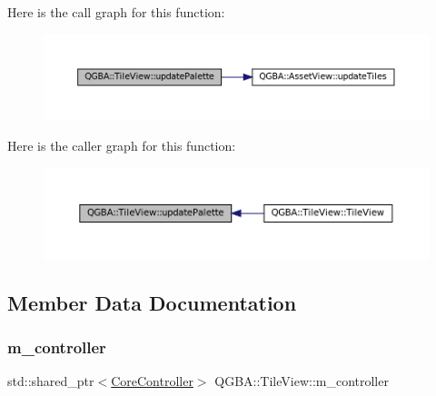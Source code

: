 Here is the call graph for this function\+:
\nopagebreak
\begin{figure}[H]
\begin{center}
\leavevmode
\includegraphics[width=350pt]{class_q_g_b_a_1_1_tile_view_a32d30c057994015181a0be9d2de123ab_cgraph}
\end{center}
\end{figure}
Here is the caller graph for this function\+:
\nopagebreak
\begin{figure}[H]
\begin{center}
\leavevmode
\includegraphics[width=350pt]{class_q_g_b_a_1_1_tile_view_a32d30c057994015181a0be9d2de123ab_icgraph}
\end{center}
\end{figure}


\subsection{Member Data Documentation}
\mbox{\label{class_q_g_b_a_1_1_tile_view_a66508a82664b6f7160c35445481ed170}} 
\subsubsection{\texorpdfstring{m\+\_\+controller}{m\_controller}}
{\footnotesize\ttfamily std\+::shared\+\_\+ptr$<$\mbox{\hyperlink{class_q_g_b_a_1_1_core_controller}{Core\+Controller}}$>$ Q\+G\+B\+A\+::\+Tile\+View\+::m\+\_\+controller\hspace{0.3cm}{\ttfamily [private]}}

\mbox{\label{class_q_g_b_a_1_1_tile_view_a9a230b2cb71c7c9416d6573cc36242ee}} 
